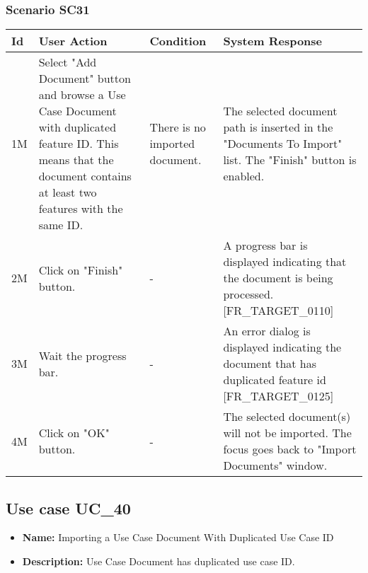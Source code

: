 \documentclass[a4paper,11pt]{article}
\newcommand{\bl}{\\ \hline}
\begin{document}
\subsubsection*{Scenario SC31}
\begin{tabular}{|p{0.4in}|p{1.5in}|p{1.5in}|p{1.5in}|}
\hline
Id & User Action & Condition & System Response \bl 
1M & Select "Add Document" button and browse a Use Case Document
						with duplicated feature ID. This means that the document contains
						at least two features with the same ID.  & There is no imported document. & The selected document path is inserted in the "Documents
						To Import" list. The "Finish" button is enabled.\bl
2M & Click on "Finish" button. & - & A progress bar is displayed indicating that the document
						is being processed. [FR_TARGET_0110] \bl
3M & Wait the progress bar.  & - & An error dialog is displayed indicating the document that
						has duplicated feature id [FR_TARGET_0125]\bl
4M & Click on "OK" button. & - & The selected document(s) will not be imported. The focus
						goes back to "Import Documents" window.\bl
\end{tabular}
\subsection*{Use case UC_40}
\begin{itemize}
\item {\bf Name: }Importing a Use Case Document With Duplicated Use Case ID
			
\item {\bf Description: }Use Case Document has duplicated use case ID.
			
\end{itemize}
\end{document}

